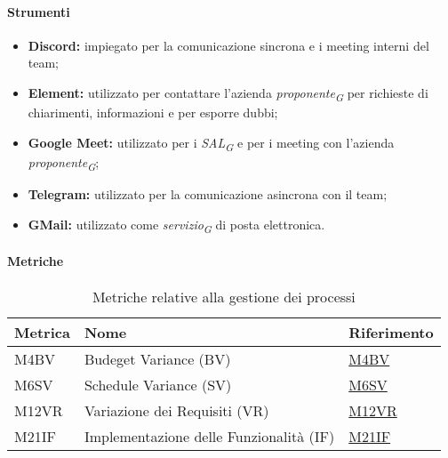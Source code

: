 \paragraph{Strumenti}
\begin{itemize}
	\item \textbf{Discord:} impiegato per la comunicazione sincrona e i meeting interni del team;
	\item \textbf{Element:} utilizzato per contattare l'azienda \textit{proponente}\textsubscript{\textit{G}} per richieste di chiarimenti, informazioni e per esporre dubbi;
	\item \textbf{Google Meet:} utilizzato per i \textit{SAL}\textsubscript{\textit{G}} e per i meeting con l'azienda \textit{proponente}\textsubscript{\textit{G}};
	\item \textbf{Telegram:} utilizzato per la comunicazione asincrona con il team;
	\item \textbf{GMail:} utilizzato come \textit{servizio}\textsubscript{\textit{G}} di posta elettronica.
\end{itemize}
\vspace{0.1cm}

\paragraph{Metriche} 
\begin{table}[H]
	\centering
	\begin{tabular}{|C{3cm}|C{4cm}|C{3cm}|}
	\hline
	\textbf{Metrica} & \textbf{Nome} & \textbf{Riferimento} \\
	\hline \hline
	M4BV & Budeget Variance (BV) &  \hyperlink{item:M4BV}{M4BV} \\
	M6SV & Schedule Variance (SV) &  \hyperlink{item:M6SV}{M6SV} \\
	M12VR & Variazione dei Requisiti (VR) &  \hyperlink{item:M12VR}{M12VR} \\
	M21IF & Implementazione delle Funzionalità (IF) & \hyperlink{item:M21IF}{M21IF} \\ 
	\hline
	\end{tabular}
	\caption{Metriche relative alla gestione dei processi}
\end{table}
